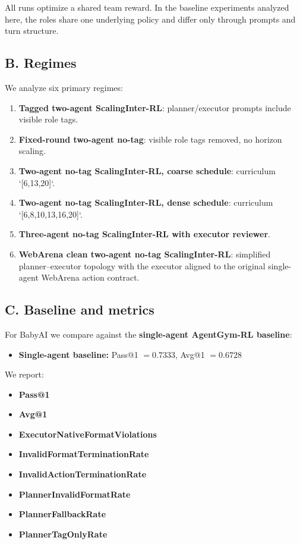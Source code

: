 \documentclass{ieeeaccess}
\begin{document}
All runs optimize a shared team reward. In the baseline experiments analyzed here, the roles share one underlying policy and differ only through prompts and turn structure.

\subsection{B. Regimes}
We analyze six primary regimes:
\begin{enumerate}
\item \textbf{Tagged two-agent ScalingInter-RL}: planner/executor prompts include visible role tags.
\item \textbf{Fixed-round two-agent no-tag}: visible role tags removed, no horizon scaling.
\item \textbf{Two-agent no-tag ScalingInter-RL, coarse schedule}: curriculum `[6,13,20]`.
\item \textbf{Two-agent no-tag ScalingInter-RL, dense schedule}: curriculum `[6,8,10,13,16,20]`.
\item \textbf{Three-agent no-tag ScalingInter-RL with executor reviewer}.
\item \textbf{WebArena clean two-agent no-tag ScalingInter-RL}: simplified planner--executor topology with the executor aligned to the original single-agent WebArena action contract.
\end{enumerate}

\subsection{C. Baseline and metrics}
For BabyAI we compare against the \textbf{single-agent AgentGym-RL baseline}:
\begin{itemize}
\item \textbf{Single-agent baseline:} Pass@1 $=0.7333$, Avg@1 $=0.6728$
\end{itemize}

We report:
\begin{itemize}
\item \textbf{Pass@1}
\item \textbf{Avg@1}
\item \textbf{ExecutorNativeFormatViolations}
\item \textbf{InvalidFormatTerminationRate}
\item \textbf{InvalidActionTerminationRate}
\item \textbf{PlannerInvalidFormatRate}
\item \textbf{PlannerFallbackRate}
\item \textbf{PlannerTagOnlyRate}
\end{itemize}
\end{document}
